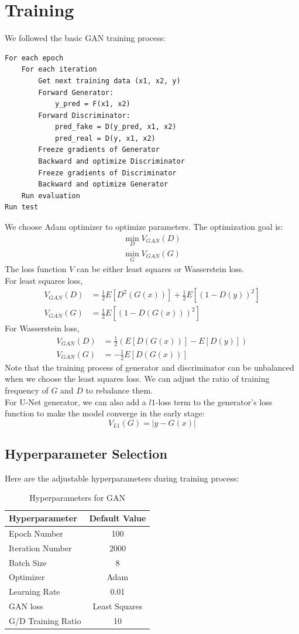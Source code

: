\documentclass[letterpaper]{article}
\begin{document}
\section{Training}
We followed the basic GAN training process:
\begin{lstlisting}
For each epoch
    For each iteration
        Get next training data (x1, x2, y)
        Forward Generator:
            y_pred = F(x1, x2)
        Forward Discriminator:
            pred_fake = D(y_pred, x1, x2)
            pred_real = D(y, x1, x2)
        Freeze gradients of Generator
        Backward and optimize Discriminator
        Freeze gradients of Discriminator
        Backward and optimize Generator
    Run evaluation
Run test
\end{lstlisting}
We choose Adam optimizer to optimize parameters. The optimization goal is:
$$\begin{aligned}
\min_{D} V_{GAN}(D)\\
\min_{G} V_{GAN}(G)
\end{aligned}$$
The loss function $V$ can be either least squares or Wasserstein loss.
\\
For least squares loss,
$$\begin{aligned}
    V_{GAN}(D) &= \frac12E[D^2(G(x))]+\frac12E[(1-D(y))^2]\\
    V_{GAN}(G) &= \frac12E[(1-D(G(x)))^2]
\end{aligned}$$
For Wasserstein loss,
$$\begin{aligned}
    V_{GAN}(D) &= \frac12\left(E[D(G(x))]-E[D(y)]\right)\\
    V_{GAN}(G) &= -\frac12E[D(G(x))]
\end{aligned}$$
Note that the training process of generator and discriminator can be unbalanced when we choose the least squares loss. We can adjust the ratio of training frequency of $G$ and $D$ to rebalance them.
\\
For U-Net generator, we can also add a $l1$-loss term to the generator's loss function to make the model converge in the early stage:
$$V_{L1}(G) = |y-G(x)|$$

\subsection{Hyperparameter Selection}
Here are the adjustable hyperparameters during training process:
\begin{table}[h]
    \centering
    \begin{tabular}{|l|c|}
        \hline
        Hyperparameter&Default Value\\
        \hline
        Epoch Number&100\\
        Iteration Number&2000\\
        Batch Size&8\\
        Optimizer&Adam\\
        Learning Rate&0.01\\
        GAN loss&Least Squares\\
        G/D Training Ratio&10\\
        \hline
    \end{tabular}
    \caption{Hyperparameters for GAN}
\end{table}
\end{document}
